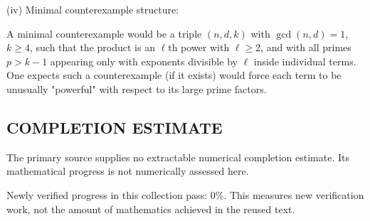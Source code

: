 (iv) Minimal counterexample structure:

A minimal counterexample would be a triple $(n,d,k)$ with $\gcd(n,d)=1$, $k\ge 4$, such that the product is an $\ell$th power with $\ell\ge 2$, and with all primes $p>k-1$ appearing only with exponents divisible by $\ell$ inside individual terms. One expects such a counterexample (if it exists) would force each term to be unusually "powerful" with respect to its large prime factors.




\subsection*{COMPLETION ESTIMATE}
The primary source supplies no extractable numerical completion estimate. Its mathematical progress is not numerically assessed here.

Newly verified progress in this collection pass: $0\%$. This measures new verification work, not the amount of mathematics achieved in the reused text.
